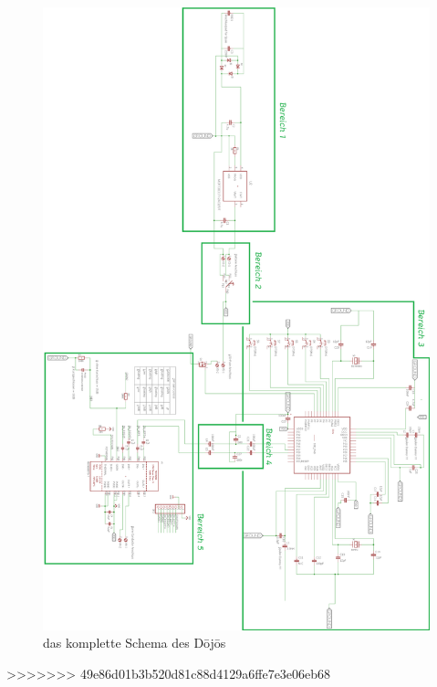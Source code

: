 \begin{figure}[H]
	\begin{center}
		\includegraphics[height=\textheight]{data/dojo-schema.png}
		\caption[das komplette Schema des Dōjōs]{das komplette Schema des Dōjōs} %
		\label{fig:dojo-schema}
	\end{center}
\end{figure}

 
>>>>>>> 49e86d01b3b520d81c88d4129a6ffe7e3e06eb68
